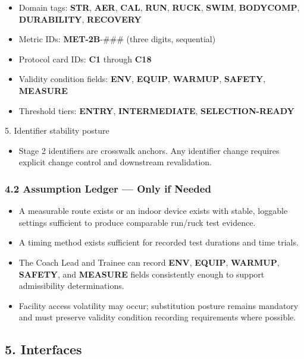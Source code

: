 \documentclass[10pt]{article}
\begin{document}
\begin{itemize}
\item Domain tags: \textbf{STR}, \textbf{AER}, \textbf{CAL}, \textbf{RUN}, \textbf{RUCK}, \textbf{SWIM}, \textbf{BODYCOMP}, \textbf{DURABILITY}, \textbf{RECOVERY}
\item Metric IDs: \textbf{MET-2B}-\#\#\# (three digits, sequential)
\item Protocol card IDs: \textbf{C1} through \textbf{C18}
\item Validity condition fields: \textbf{ENV}, \textbf{EQUIP}, \textbf{WARMUP}, \textbf{SAFETY}, \textbf{MEASURE}
\item Threshold tiers: \textbf{ENTRY}, \textbf{INTERMEDIATE}, \textbf{SELECTION-READY}
\end{itemize}

5. Identifier stability posture

\begin{itemize}
\item Stage 2 identifiers are crosswalk anchors. Any identifier change requires explicit change control and downstream revalidation.
\end{itemize}

\subsubsection*{4.2 Assumption Ledger — Only if Needed}

\begin{itemize}
\item A measurable route exists or an indoor device exists with stable, loggable settings sufficient to produce comparable run/ruck test evidence.
\item A timing method exists sufficient for recorded test durations and time trials.
\item The Coach Lead and Trainee can record \textbf{ENV}, \textbf{EQUIP}, \textbf{WARMUP}, \textbf{SAFETY}, and \textbf{MEASURE} fields consistently enough to support admissibility determinations.
\item Facility access volatility may occur; substitution posture remains mandatory and must preserve validity condition recording requirements where possible.
\end{itemize}

\subsection*{5. Interfaces}
\end{document}
